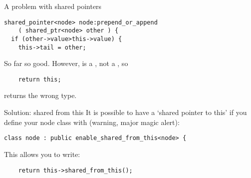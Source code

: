 \begin{block}{A problem with shared pointers}
  \label{sl:share-ptr-node-sh}
\begin{verbatim}
shared_pointer<node> node:prepend_or_append
    ( shared_ptr<node> other ) {
  if (other->value>this->value) {
    this->tail = other;
\end{verbatim}
So far so good. However,  is a , not a
, so
\begin{verbatim}
    return this;
\end{verbatim}
returns the wrong type.
\end{block}

\begin{block}{Solution: shared from this}
  \label{sl:share-ptr-node-from}
  It is possible to have a `shared pointer to this' if you
  define your node class with (warning, major magic alert):
\begin{verbatim}
class node : public enable_shared_from_this<node> {
\end{verbatim}
This allows you to write:
\begin{verbatim}
    return this->shared_from_this();
\end{verbatim}
\end{block}
